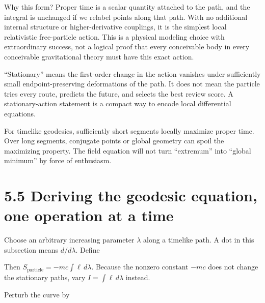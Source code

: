 \documentclass[
  11pt,
  letterpaper,
  oneside,
  openany]{scrbook}
\begin{document}
Why this form? Proper time is a scalar quantity attached to the path,
and the integral is unchanged if we relabel points along that path. With
no additional internal structure or higher-derivative couplings, it is
the simplest local relativistic free-particle action. This is a physical
modeling choice with extraordinary success, not a logical proof that
every conceivable body in every conceivable gravitational theory must
have this exact action.

``Stationary'' means the first-order change in the action vanishes under
sufficiently small endpoint-preserving deformations of the path. It does
not mean the particle tries every route, predicts the future, and
selects the best review score. A stationary-action statement is a
compact way to encode local differential equations.

For timelike geodesics, sufficiently short segments locally maximize
proper time. Over long segments, conjugate points or global geometry can
spoil the maximizing property. The field equation will not turn
``extremum'' into ``global minimum'' by force of enthusiasm.

\hypertarget{deriving-the-geodesic-equation-one-operation-at-a-time}{%
\section{5.5 Deriving the geodesic equation, one operation at a
time}\label{deriving-the-geodesic-equation-one-operation-at-a-time}}

Choose an arbitrary increasing parameter \(\lambda\) along a timelike
path. A dot in this subsection means \(d/d\lambda\). Define

\begin{center}
\begingroup
{}
\ifdim\wd\grmathbox>\linewidth
\resizebox{\linewidth}{!}{\usebox{\grmathbox}}
\else\usebox{\grmathbox}\fi
\endgroup
\end{center}

Then \(S_{\mathrm{particle}}=-mc\int\ell\,d\lambda\). Because the
nonzero constant \(-mc\) does not change the stationary paths, vary
\(I=\int\ell\,d\lambda\) instead.

Perturb the curve by

\begin{center}
\begingroup
{}
\ifdim\wd\grmathbox>\linewidth
\resizebox{\linewidth}{!}{\usebox{\grmathbox}}
\else\usebox{\grmathbox}\fi
\endgroup
\end{center}
\end{document}
